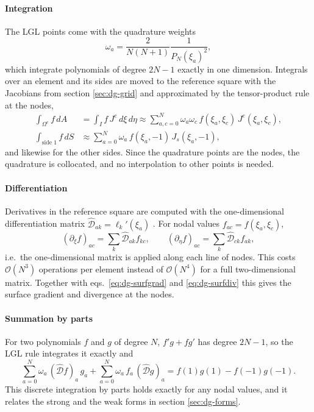 \paragraph{Integration}
The LGL points come with the quadrature weights
\begin{equation*}
    \omega_a = \frac{2}{N(N+1)}\frac{1}{P_N(\xi_a)^2},
\end{equation*}
which integrate polynomials of degree $2N-1$ exactly in one dimension. Integrals over an element and its sides are moved to the reference square with the Jacobians from section \ref{sec:dg-grid} and approximated by the tensor-product rule at the nodes,
\begin{align}
    \int_{\Omega^e}f\,dA &= \int_I f\,J^e\,d\xi\,d\eta \approx \sum_{a,c=0}^{N}\omega_a\omega_c\,f(\xi_a,\xi_c)\,J^e(\xi_a,\xi_c), \label{eq:dg-quad}\\
    \int_{\text{side 1}}f\,dS &\approx \sum_{a=0}^{N}\omega_a\,f(\xi_a,-1)\,J_s(\xi_a,-1), \nonumber
\end{align}
and likewise for the other sides. Since the quadrature points are the nodes, the quadrature is collocated, and no interpolation to other points is needed.

\paragraph{Differentiation}
Derivatives in the reference square are computed with the one-dimensional differentiation matrix $\hat{\mathcal{D}}_{ak} = \ell_k'(\xi_a)$ \cite{hesthaven2008nodal}. For nodal values $f_{ac} = f(\xi_a,\xi_c)$,
\begin{equation*}
    \left(\partial_\xi f\right)_{ac} = \sum_{k}\hat{\mathcal{D}}_{ak}f_{kc}, \qquad \left(\partial_\eta f\right)_{ac} = \sum_{k}\hat{\mathcal{D}}_{ck}f_{ak},
\end{equation*}
i.e.\ the one-dimensional matrix is applied along each line of nodes. This costs $\mathcal{O}(N^3)$ operations per element instead of $\mathcal{O}(N^4)$ for a full two-dimensional matrix. Together with eqs.~\eqref{eq:dg-surfgrad} and \eqref{eq:dg-surfdiv} this gives the surface gradient and divergence at the nodes.

\paragraph{Summation by parts}
For two polynomials $f$ and $g$ of degree $N$, $f'g + fg'$ has degree $2N-1$, so the LGL rule integrates it exactly and
\begin{equation}\label{eq:dg-sbp}
    \sum_{a=0}^{N}\omega_a\,(\hat{\mathcal{D}}f)_a\,g_a + \sum_{a=0}^{N}\omega_a\,f_a\,(\hat{\mathcal{D}}g)_a = f(1)g(1) - f(-1)g(-1).
\end{equation}
This discrete integration by parts holds exactly for any nodal values, and it relates the strong and the weak forms in section \ref{sec:dg-forms}.

